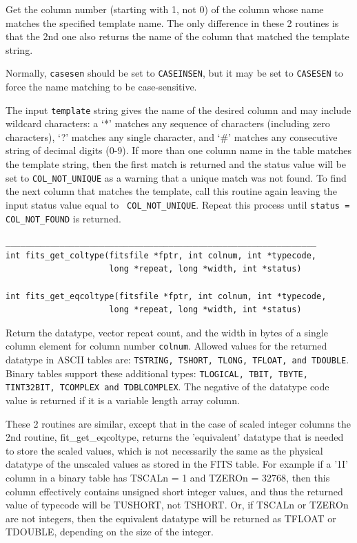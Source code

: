 \documentclass[11pt]{article}
\begin{document}
Get the  column number (starting with 1, not 0) of the column whose
name matches the specified template name.  The only difference in
these 2 routines is that the 2nd one also returns the name of the
column that matched the template string.

Normally, {\tt casesen} should
be set to {\tt CASEINSEN}, but it may be set to {\tt CASESEN} to force
the name matching to be case-sensitive.

The input {\tt template} string gives the name of the desired column and
may include wildcard characters:  a `*' matches any sequence of
characters (including zero characters), `?' matches any single
character, and `\#' matches any consecutive string of decimal digits
(0-9).  If more than one column name in the table matches the template
string, then the first match is returned and the status value will be
set to {\tt COL\_NOT\_UNIQUE}  as a warning that a unique match was not
found.  To find the next column that matches the template, call this
routine again leaving the input status value equal to {\tt
COL\_NOT\_UNIQUE}.  Repeat this process until {\tt status =
COL\_NOT\_FOUND}  is returned.

\begin{verbatim}
_______________________________________________________________
int fits_get_coltype(fitsfile *fptr, int colnum, int *typecode,
                     long *repeat, long *width, int *status)

int fits_get_eqcoltype(fitsfile *fptr, int colnum, int *typecode,
                     long *repeat, long *width, int *status)
\end{verbatim}

Return the datatype, vector repeat count, and the width in bytes of a
single column element for column number {\tt colnum}.  Allowed values
for the returned datatype in ASCII tables are:  {\tt TSTRING, TSHORT,
TLONG, TFLOAT, and TDOUBLE}.  Binary tables support these additional
types: {\tt TLOGICAL, TBIT, TBYTE, TINT32BIT, TCOMPLEX and TDBLCOMPLEX}.  The
negative of the datatype code value is returned if it is a variable
length array column.

These 2 routines are similar, except that in the case of scaled
integer columns the 2nd routine, fit\_get\_eqcoltype, returns the
'equivalent' datatype that is needed to store the scaled values, which
is not necessarily the same as the physical datatype of the unscaled values
as stored in the FITS table.  For example if a '1I' column in a binary
table has TSCALn = 1 and TZEROn = 32768, then this column effectively
contains unsigned short integer values, and thus the returned value of
typecode will be TUSHORT, not TSHORT.  Or, if TSCALn or TZEROn are not
integers, then the equivalent datatype will be returned as TFLOAT or
TDOUBLE, depending on the size of the integer.
\end{document}
